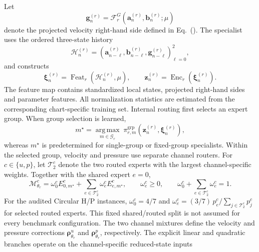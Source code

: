 Let
\begin{equation}
  \bm g_n^{(r)}
  =
  \mathcal F_r^G
  \left(
    \bm a_n^{(r)},\bm b_n^{(r)};\mu
  \right)
  \label{eq:app_galerkin_feature}
\end{equation}
denote the projected velocity right-hand side defined in Eq.~(). The specialist uses the ordered three-state history
\begin{equation}
  \mathcal H_n^{(r)}
  =
  \left(
    \bm a_{n-\ell}^{(r)},
    \bm b_{n-\ell}^{(r)},
    \bm g_{n-\ell}^{(r)}
  \right)_{\ell=0}^{2},
  \label{eq:app_specialist_history}
\end{equation}
and constructs
\begin{equation}
  \bm\xi_n^{(r)}
  =
  \operatorname{Feat}_r
  \left(
    \mathcal H_n^{(r)},\mu
  \right),
  \qquad
  \bm z_n^{(r)}
  =
  \operatorname{Enc}_r
  \left(
    \bm\xi_n^{(r)}
  \right).
  \label{eq:app_specialist_features}
\end{equation}
The feature map contains standardized local states, projected
right-hand sides and parameter features. All normalization statistics are estimated from the corresponding chart-specific training set. Internal routing first selects an expert group. When group selection is learned,
\begin{equation}
  m^\star
  =
  \underset{m\in\mathcal G_r}{\operatorname{arg\,max}}
  \;
  \pi_{r,m}^{\mathrm{grp}}
  \left(
    \bm z_n^{(r)},\bm\xi_n^{(r)}
  \right),
  \label{eq:app_group_top1}
\end{equation}
whereas $m^\star$ is predetermined for single-group or fixed-group
specialists. Within the selected group, velocity and pressure use separate channel routers. For $c\in\{u,p\}$, let $\mathcal T_2^c$ denote the two routed experts with the largest channel-specific weights. Together with the shared expert $e=0$,
\begin{equation}
  \mathcal M_{\theta_r}^c
  =
  \omega_0^c
  E_{0,m^\star}^c
  +
  \sum_{e\in\mathcal T_2^c}
  \omega_e^c
  E_{e,m^\star}^c,
  \qquad
  \omega_e^c\ge0,
  \qquad
  \omega_0^c+\sum_{e\in\mathcal T_2^c}\omega_e^c=1.
  \label{eq:app_channel_sparse_moe}
\end{equation}
For the audited Circular H/P instances, $\omega_0^c=4/7$ and
$\omega_e^c=(3/7)\,p_e^c/\sum_{j\in\mathcal T_2^c}p_j^c$ for selected
routed experts. This fixed shared/routed split is not assumed for every
benchmark configuration.
The two channel mixtures define the velocity and pressure corrections
$\bm\rho_{\theta_r}^u$ and $\bm\rho_{\theta_r}^p$, respectively. The explicit linear and quadratic branches operate on the channel-specific reduced-state inputs
